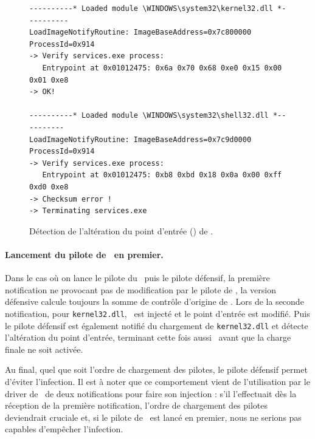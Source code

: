 \begin{figure}[h]
\begin{center}
\scriptsize
\begin{lstlisting}[language={}]
----------* Loaded module \WINDOWS\system32\kernel32.dll *----------
LoadImageNotifyRoutine: ImageBaseAddress=0x7c800000 ProcessId=0x914 
-> Verify services.exe process: 
   Entrypoint at 0x01012475: 0x6a 0x70 0x68 0xe0 0x15 0x00 0x01 0xe8
-> OK!

----------* Loaded module \WINDOWS\system32\shell32.dll *----------
LoadImageNotifyRoutine: ImageBaseAddress=0x7c9d0000 ProcessId=0x914 
-> Verify services.exe process:
   Entrypoint at 0x01012475: 0xb8 0xbd 0x18 0x0a 0x00 0xff 0xd0 0xe8
-> Checksum error !
-> Terminating services.exe
\end{lstlisting}
\end{center}
\caption{Détection de l'altération du point d'entrée () de \services.\label{fig:Breakpoint2}}
\end{figure}

\paragraph{Lancement du pilote de \duqu\ en premier.}
Dans le cas où on lance le pilote du \duqu\ puis le pilote défensif, la première notification ne provocant pas de modification par le pilote de \duqu, la version défensive calcule toujours la somme de contrôle d'origine de \services.
Lors de la seconde notification, pour \texttt{kernel32.dll}, \duqu\ est injecté et le point d'entrée est modifié. Puis le pilote défensif est également notifié du chargement de \texttt{kernel32.dll} et détecte l'altération du point d'entrée, terminant cette fois aussi \services\ avant que la charge finale ne soit activée.

Au final, quel que soit l'ordre de chargement des pilotes, le pilote défensif permet d'éviter l'infection.
Il est à noter que ce comportement vient de l'utilisation par le driver de \duqu\ de deux notifications pour faire son injection : s'il l'effectuait dès la réception de la première notification, l'ordre de chargement des pilotes deviendrait cruciale et, si le pilote de \duqu\ est lancé en premier, nous ne serions pas capables d'empêcher l'infection.

